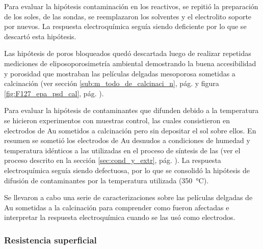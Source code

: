{{  			Para evaluar la hipótesis contaminación en los reactivos, se repitió la preparación de los soles, de las sondas, se reemplazaron los solventes y el electrolito soporte por nuevos. La respuesta electroquímica seguía siendo deficiente por lo que se descartó esta hipótesis. 

  			Las hipótesis de poros bloqueados quedó descartada luego de realizar repetidas mediciones de eliposoporosimetría ambiental demostrando la buena accesibilidad y porosidad que mostraban las películas delgadas mesoporosa sometidas a  calcinación (ver sección \ref{sub:m_todo_de_calcinaci_n}, pág. \pageref{sub:m_todo_de_calcinaci_n} y figura \ref{fig:F127_epa_psd_cal}, pág. \pageref{fig:F127_epa_psd_cal}).

  			Para evaluar la hipótesis de contaminantes que difunden debido a la temperatura se hicieron experimentos con muestras control, las cuales consistieron en electrodos de Au sometidos a calcinación pero sin depositar el sol sobre ellos. En resumen se sometió los electrodos de Au desnudos a condiciones de humedad y temperatura idénticos a las utilizadas en el proceso de síntesis de las \pdm\space (ver el proceso descrito en la sección \ref{sec:cond_y_extr}, pág. \pageref{sec:cond_y_extr}). La respuesta electroquímica seguía siendo defectuosa, por lo que se consolidó la hipótesis de difusión de contaminantes por la temperatura utilizada (\SI{350}{\celsius}). 

  			Se llevaron a cabo una serie de caracterizaciones sobre las películas delgadas de Au sometidas a la calcinación para comprender como fueron afectadas e interpretar la respuesta electroquímica cuando se las usó como electrodos.
		
		\subsubsection{Resistencia superficial}

}}
